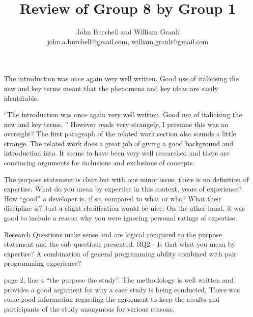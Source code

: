\documentclass[times, 10pt,twocolumn]{article}
\begin{document}
\title{Review of Group 8 by Group 1}

\author{John Burchell and William Granli \\
john.a.burchell@gmail.com, william.granli@gmail.com}



\maketitle
\thispagestyle{empty}







The introduction was once again very well written. Good use of italicising the new and key terms meant that the phenomena and key ideas are easily identifiable. 

``The introduction was once again very well written. Good use of italicising the new and key terms. '' However reads very strangely, I presume this was an oversight? The first paragraph of the related work section also sounds a little strange. The related work does a great job of giving a good background and introduction into. It seems to have been very well researched and there are convincing arguments for inclusions and exclusions of concepts.


The purpose statement is clear but with one minor issue, there is no definition of expertise. What do you mean by expertise in this context, years of experience? How ``good'' a developer is, if so, compared to what or who? What their discipline is? Just a slight clarification would be nice. On the other hand, it was good to include a reason why you were ignoring personal ratings of expertise.

Research Questions make sense and are logical compared to the purpose statement and the sub-questions presented.
RQ2 - Is that what you mean by expertise? A combination of general programming ability combined with pair programming experience?

page 2, line 4 ``the purpose the study''.
The methodology is well written and provides a good argument for why a case study is being conducted. There was some good information regarding the agreement to keep the results and participants of the study anonymous for various reasons.
\end{document}
